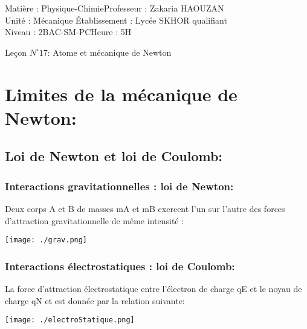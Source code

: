 \documentclass[12pt]{article}
\author{Zakaria HAOUZAN}
\date{\today}
\newcommand\headerMe[2]{\noindent{}#1\hfill#2}
\begin{document}
\headerMe{Matière : Physique-Chimie}{Professeur : Zakaria HAOUZAN}\\
\headerMe{Unité : Mécanique }{Établissement : Lycée SKHOR qualifiant}\\
\headerMe{Niveau : 2BAC-SM-PC}{Heure : 5H}\\

\begin{center}

    \Large{Leçon $N^{\circ} 17 $: \color{red}Atome et mécanique de Newton}
\end{center}






\section{Limites de la mécanique de Newton:}
\subsection{Loi de Newton et loi de Coulomb:}
\subsubsection{Interactions gravitationnelles : loi de Newton:}
Deux corps A et B de masses mA et mB exercent l'un sur l'autre des forces d'attraction gravitationnelle de même intensité :
\begin{center}

	\texttt{[image: ./grav.png]}
\end{center}


\subsubsection{Interactions électrostatiques : loi de Coulomb:}
La force d'attraction électrostatique entre l'électron de charge qE et le noyau de charge qN et est donnée par la relation suivante:
\begin{center}

	\texttt{[image: ./electroStatique.png]}
\end{center}
\end{document}
